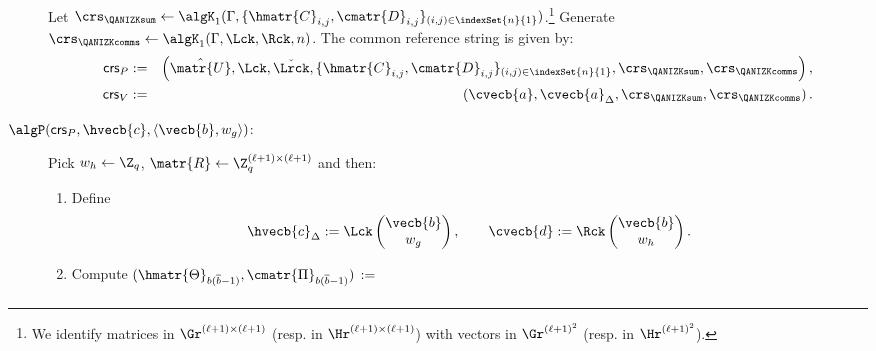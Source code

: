 \begin{description}
Let
$\crs_\QANIZKsum \gets \algK_1(\Gamma, \{\hmatr{C}_{i,j},\cmatr{D}_{i,j}\}_{(i,j)\in\indexSet{n}{1}})$.\footnote{We identify
matrices in $\Gr^{(\ell+1) \times (\ell+1)}$ (resp. in $\Hr^{(\ell+1) \times (\ell+1)}$) with vectors in $\Gr^{(\ell+1)^2}$ (resp. in $\Hr^{(\ell+1)^2}$).} Generate $\crs_\QANIZKcomms \gets \algK_1(\Gamma, \Lck,\Rck,n)$. 
The common reference string is given by:
\begin{eqnarray*}
\mathsf{crs}_P&:=&\left( \hat{\matr{U}},  \Lck,
    \check{\Lrck}, \{\hmatr{C}_{i,j},\cmatr{D}_{i,j} \}_{(i,j) \in \indexSet{n}{1}},\crs_\QANIZKsum,\crs_\QANIZKcomms \right), \\
\mathsf{crs}_V&:=&\left(\cvecb{a}, \cvecb{a}_\Delta, \crs_\QANIZKsum,\crs_\QANIZKcomms \right). 
 \end{eqnarray*}
\item[$\algP(\mathsf{crs}_P, \hvecb{c}, \langle \vecb{b}, w_g \rangle)$:]
Pick $w_h \gets \Z_q$,  $\matr{R} \gets \Z_q^{(\ell+1)\times (\ell+1)}$ and then: 
\begin{enumerate}
\item Define 
$$\hvecb{c}_{\Delta} := \Lck \begin{pmatrix} \vecb{b} \\ w_g \end{pmatrix},
\qquad \cvecb{d} := \Rck \begin{pmatrix} \vecb{b} \\ w_h \end{pmatrix}.$$ 
\item Compute 
 $(\hmatr{\Theta}_{b(\overline{b}-1)}, \cmatr{\Pi}_{b(\overline{b}-1)})\, :=$
\begin{eqnarray} \label{eq:ThetaPi}

\end{eqnarray}
\end{enumerate}
\end{description}
